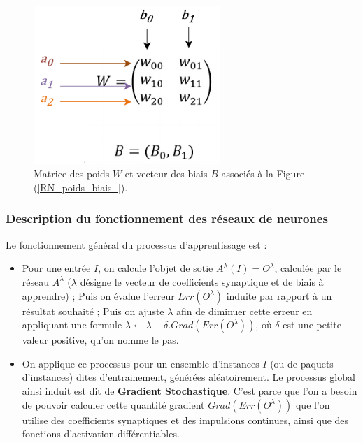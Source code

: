 \begin{figure}[H]
	\centerline{
		\includegraphics[height=6cm]{images_these/RN_matrice_poids.pdf}}
	\caption[Une matrice des poids $W$ et un vecteur des biais $B$. ]{Matrice des poids $W$ et vecteur des biais $B$ associés à la Figure (\ref{RN_poids_biais--}).}
	\label{RN_matrice_poids}
\end{figure}


\subsubsection{Description du fonctionnement des réseaux de neurones}

Le fonctionnement général du processus d'apprentissage est :
\begin{itemize}[label=$\square$]
	\item Pour une entrée $I$, on calcule l'objet de sotie $A^\lambda(I) = O^\lambda$, calculée par le réseau $A^\lambda$ ($\lambda$ désigne le vecteur de coefficients synaptique et de biais à apprendre) ; Puis on évalue l'erreur $Err(O^\lambda)$ induite par rapport à un résultat souhaité ; Puis on ajuste $\lambda$ afin de diminuer cette erreur en appliquant une formule $\lambda \leftarrow  \lambda - \delta.Grad(Err(O^\lambda))$, où $\delta$ est une petite valeur positive, qu'on nomme le pas.
	\item On applique ce processus pour un ensemble d'instances $I$ (ou de paquets d'instances) dites d'entrainement, générées aléatoirement. Le processus global ainsi induit est dit de \textbf{Gradient Stochastique}. C'est parce que l'on a besoin de pouvoir calculer cette quantité gradient $Grad(Err(O^\lambda))$ que l'on utilise des coefficients synaptiques et des impulsions continues, ainsi que des fonctions d'activation différentiables.
\end{itemize}

